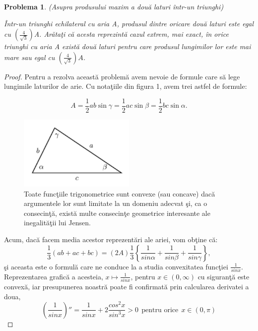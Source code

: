 \documentclass[a4paper,12pt,oneside]{report}
\newtheorem{problem}{Problema}
\begin{document}
\begin{problem}(Asupra produsului maxim a dou\u{a} laturi \^{i}ntr-un triunghi)

\^{I}ntr-un triunghi echilateral cu aria A, produsul dintre oricare dou\u{a} laturi este egal cu \(\left (\frac{4}{\sqrt{3}}  \right )\)A. Ar\u{a}ta\c{t}i c\u{a} acesta reprezint\u{a} cazul extrem, mai exact, \^{i}n orice triunghi cu aria A  exist\u{a} dou\u{a} laturi pentru care produsul lungimilor lor este mai mare sau egal cu \(\left (\frac{4}{\sqrt{3}}  \right )A\).
\end{problem}
\begin{proof}
  Pentru a rezolva aceast\u{a} problem\u{a} avem nevoie de formule care s\u{a} lege lungimile laturilor de arie. Cu nota\c{t}iile din figura 1, avem trei astfel de formule:

\begin{displaymath}
  A = \frac{1}{2}ab \sin\gamma = \frac{1}{2}ac \sin \beta = \frac{1}{2}bc \sin \alpha.
\end{displaymath}

\begin{figure}[htbp]
	\centering
	\includegraphics[width=0.5\textwidth]{fig2.1.png}
	\caption{ Toate func\c{t}iile trigonometrice sunt convexe (sau concave) dac\u{a}
argumentele lor sunt limitate la un domeniu adecvat \c{s}i, ca o consecin\c{t}\u{a},
exist\u{a} multe consecin\c{t}e geometrice interesante ale inegalit\u{a}\c{t}ii lui Jensen.}
\end{figure}

\newpage

Acum, dac\u{a} facem media acestor reprezent\u{a}ri ale ariei, vom ob\c{t}ine c\u{a}:
\begin{displaymath}
  \frac{1}{3}\left ( ab + ac + bc \right )= \left ( 2A \right )\frac{1}{3}\left \{ \frac{1}{sin \alpha } + \frac{1}{sin \beta } + \frac{1}{sin \gamma }\right \}, \label{eq:2.1} \tag{2.1}
\end{displaymath}
\c{s}i aceasta este o formul\u{a} care ne conduce la a studia convexitatea func\c{t}iei \(\frac{1}{sin x}\). Reprezentarea grafic\u{a} a acesteia, \(x \mapsto \frac{1}{sin x}\), pentru \(x\in \left ( 0, \infty  \right )\) cu siguran\c{t}\u{a} este convex\u{a}, iar presupunerea noastr\u{a} poate fi confirmat\u{a} prin calcularea derivatei a doua,
\begin{displaymath}
  {\left ( \frac{1}{sin x} \right )}''= \frac{1}{sin x} + 2\frac{cos^{2}x}{sin ^{3}x}> 0~~ \text{pentru orice}~~ x\in \left ( 0, \pi  \right )  \label{eq:2.2} \tag{2.2}
\end{displaymath}


\end{proof}
\end{document}
